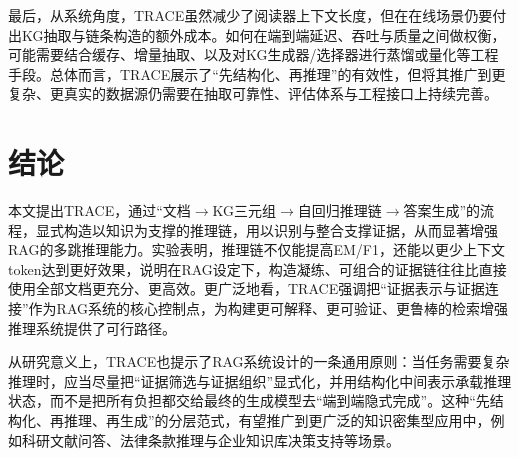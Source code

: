 最后，从系统角度，TRACE虽然减少了阅读器上下文长度，但在在线场景仍要付出KG抽取与链条构造的额外成本。如何在端到端延迟、吞吐与质量之间做权衡，可能需要结合缓存、增量抽取、以及对KG生成器/选择器进行蒸馏或量化等工程手段。总体而言，TRACE展示了“先结构化、再推理”的有效性，但将其推广到更复杂、更真实的数据源仍需要在抽取可靠性、评估体系与工程接口上持续完善。

\section{结论}
本文提出TRACE，通过“文档$\rightarrow$KG三元组$\rightarrow$自回归推理链$\rightarrow$答案生成”的流程，显式构造以知识为支撑的推理链，用以识别与整合支撑证据，从而显著增强RAG的多跳推理能力。实验表明，推理链不仅能提高EM/F1，还能以更少上下文token达到更好效果，说明在RAG设定下，构造凝练、可组合的证据链往往比直接使用全部文档更充分、更高效。更广泛地看，TRACE强调把“证据表示与证据连接”作为RAG系统的核心控制点，为构建更可解释、更可验证、更鲁棒的检索增强推理系统提供了可行路径。

从研究意义上，TRACE也提示了RAG系统设计的一条通用原则：当任务需要复杂推理时，应当尽量把“证据筛选与证据组织”显式化，并用结构化中间表示承载推理状态，而不是把所有负担都交给最终的生成模型去“端到端隐式完成”。这种“先结构化、再推理、再生成”的分层范式，有望推广到更广泛的知识密集型应用中，例如科研文献问答、法律条款推理与企业知识库决策支持等场景。

\endinput
